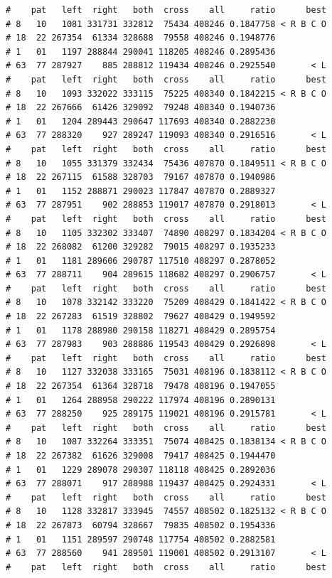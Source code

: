 \documentclass{article}\usepackage[]{graphicx}\usepackage[]{color}
\makeatletter
\newenvironment{kframe}{%
 \def\at@end@of@kframe{}%
 \ifinner\ifhmode%
  \def\at@end@of@kframe{\end{minipage}}%
  \begin{minipage}{\columnwidth}%
 \fi\fi%
 \def\FrameCommand##1{\hskip\@totalleftmargin \hskip-\fboxsep
 \colorbox{shadecolor}{##1}\hskip-\fboxsep
     \hskip-\linewidth \hskip-\@totalleftmargin \hskip\columnwidth}%
 \MakeFramed {\advance\hsize-\width
   \@totalleftmargin\z@ \linewidth\hsize
   \@setminipage}}%
 {\par\unskip\endMakeFramed%
 \at@end@of@kframe}
\newenvironment{knitrout}{}{} %
\makeatother
\begin{document}
\begin{knitrout}
\begin{kframe}
\begin{verbatim}
#    pat   left  right   both  cross    all     ratio      best
# 8   10   1081 331731 332812  75434 408246 0.1847758 < R B C O
# 18  22 267354  61334 328688  79558 408246 0.1948776          
# 1   01   1197 288844 290041 118205 408246 0.2895436          
# 63  77 287927    885 288812 119434 408246 0.2925540       < L
#    pat   left  right   both  cross    all     ratio      best
# 8   10   1093 332022 333115  75225 408340 0.1842215 < R B C O
# 18  22 267666  61426 329092  79248 408340 0.1940736          
# 1   01   1204 289443 290647 117693 408340 0.2882230          
# 63  77 288320    927 289247 119093 408340 0.2916516       < L
#    pat   left  right   both  cross    all     ratio      best
# 8   10   1055 331379 332434  75436 407870 0.1849511 < R B C O
# 18  22 267115  61588 328703  79167 407870 0.1940986          
# 1   01   1152 288871 290023 117847 407870 0.2889327          
# 63  77 287951    902 288853 119017 407870 0.2918013       < L
#    pat   left  right   both  cross    all     ratio      best
# 8   10   1105 332302 333407  74890 408297 0.1834204 < R B C O
# 18  22 268082  61200 329282  79015 408297 0.1935233          
# 1   01   1181 289606 290787 117510 408297 0.2878052          
# 63  77 288711    904 289615 118682 408297 0.2906757       < L
#    pat   left  right   both  cross    all     ratio      best
# 8   10   1078 332142 333220  75209 408429 0.1841422 < R B C O
# 18  22 267283  61519 328802  79627 408429 0.1949592          
# 1   01   1178 288980 290158 118271 408429 0.2895754          
# 63  77 287983    903 288886 119543 408429 0.2926898       < L
#    pat   left  right   both  cross    all     ratio      best
# 8   10   1127 332038 333165  75031 408196 0.1838112 < R B C O
# 18  22 267354  61364 328718  79478 408196 0.1947055          
# 1   01   1264 288958 290222 117974 408196 0.2890131          
# 63  77 288250    925 289175 119021 408196 0.2915781       < L
#    pat   left  right   both  cross    all     ratio      best
# 8   10   1087 332264 333351  75074 408425 0.1838134 < R B C O
# 18  22 267382  61626 329008  79417 408425 0.1944470          
# 1   01   1229 289078 290307 118118 408425 0.2892036          
# 63  77 288071    917 288988 119437 408425 0.2924331       < L
#    pat   left  right   both  cross    all     ratio      best
# 8   10   1128 332817 333945  74557 408502 0.1825132 < R B C O
# 18  22 267873  60794 328667  79835 408502 0.1954336          
# 1   01   1151 289597 290748 117754 408502 0.2882581          
# 63  77 288560    941 289501 119001 408502 0.2913107       < L
#    pat   left  right   both  cross    all     ratio      best

\end{verbatim}
\end{kframe}
\end{knitrout}
\end{document}
